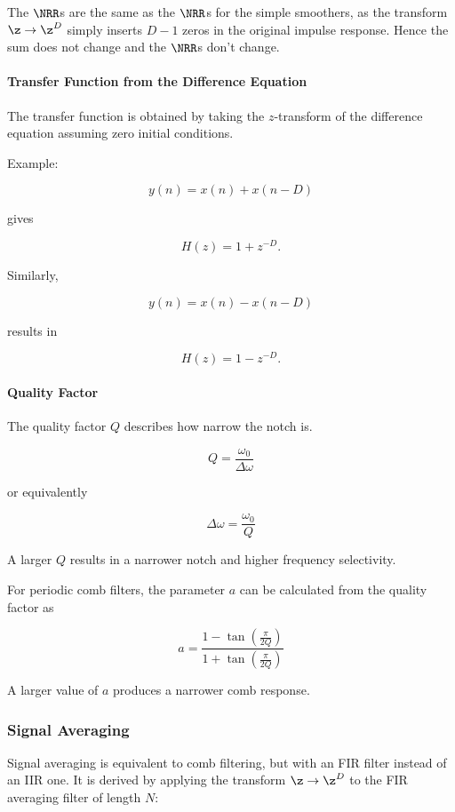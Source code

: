 The $\NRR$s are the same as the $\NRR$s for the simple smoothers, as the
transform $\z \to \z^{D}$ simply inserts $D-1$ zeros in the original
impulse response. Hence the sum does not change and the $\NRR$s don't change.

\paragraph{Transfer Function from the Difference Equation}

The transfer function is obtained by taking the $z$-transform of the
difference equation assuming zero initial conditions.

Example:

\[
y(n)=x(n)+x(n-D)
\]

gives

\[
H(z)=1+z^{-D}.
\]

Similarly,

\[
y(n)=x(n)-x(n-D)
\]

results in

\[
H(z)=1-z^{-D}.
\]

\paragraph{Quality Factor}

The quality factor $Q$ describes how narrow the notch is.

\[
\boxed{
Q=\frac{\omega_0}{\Delta\omega}
}
\]

or equivalently

\[
\boxed{
\Delta\omega=\frac{\omega_0}{Q}
}
\]

A larger $Q$ results in a narrower notch and higher frequency
selectivity.

For periodic comb filters, the parameter $a$ can be calculated from the
quality factor as

\[
\boxed{
a=
\frac{1-\tan\left(\frac{\pi}{2Q}\right)}
{1+\tan\left(\frac{\pi}{2Q}\right)}
}
\]

A larger value of $a$ produces a narrower comb response.

\subsubsection{Signal Averaging}
Signal averaging is equivalent to comb filtering, but with an FIR filter
instead of an IIR one. It is derived by applying the transform $\z \to \z^{D}$
to the FIR averaging filter of length $N$:

